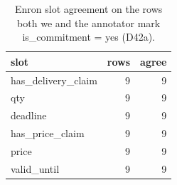 \begin{table}[t]
\centering
\small
\caption{Enron slot agreement on the rows both we and the annotator mark is\_commitment = yes (D42a).}
\label{tab:annotator_slots}
\begin{tabular}{lrr}
\toprule
slot & rows & agree \\
\midrule
has\_delivery\_claim & 9 & 9 \\
qty & 9 & 9 \\
deadline & 9 & 9 \\
has\_price\_claim & 9 & 9 \\
price & 9 & 9 \\
valid\_until & 9 & 9 \\
\bottomrule
\end{tabular}
\end{table}
